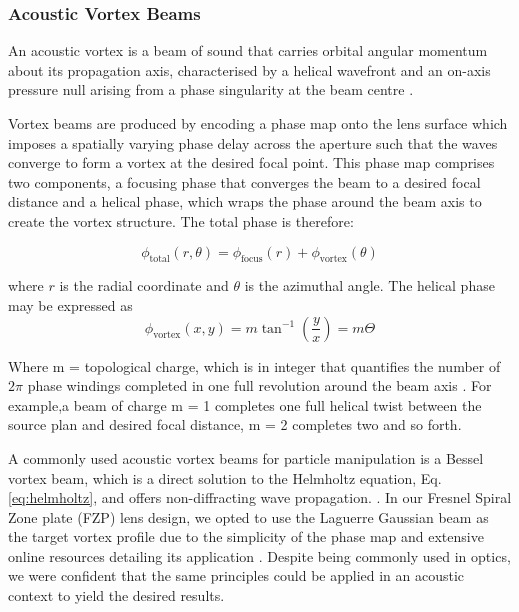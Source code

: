 \documentclass[11pt,a4paper]{article}
\begin{document}
\subsubsection{Acoustic Vortex Beams}
An acoustic vortex is a beam of sound that carries orbital angular momentum about its propagation axis, characterised by a helical wavefront and an on-axis pressure null arising from a phase singularity at the beam centre \cite{guo2022review}.

Vortex beams are produced by encoding a phase map onto the lens surface which imposes a spatially varying phase delay across the aperture such that the waves converge to form a vortex at the desired focal point. This phase map comprises two components, a focusing phase that converges the beam to a desired focal distance and a helical phase, which wraps the phase around the beam axis to create the vortex structure. The total phase is therefore:

\begin{equation}
    \phi_{\mathrm{total}}(r, \theta) = \phi_{\mathrm{focus}}(r) + 
    \phi_{\mathrm{vortex}}(\theta)
\end{equation} 

\noindent where $r$ is the radial coordinate and $\theta$ is the azimuthal angle. The helical phase may be expressed as
\begin{equation}
    \phi_{\mathrm{vortex}}(x,y)=m\tan^{-1}\!\left(\frac{y}{x}\right) = m \Theta
\end{equation}

\noindent Where m = topological charge, which is in integer that quantifies the number of $2\pi$ phase windings completed in one full revolution around the beam axis \cite{nye1974dislocations}. For example,a beam of charge m = 1 completes one full helical twist between the source plan and desired focal distance, m = 2 completes two and so forth. 

A commonly used acoustic vortex beams for particle manipulation is a Bessel vortex beam, which is a direct solution to the Helmholtz equation, Eq. \ref{eq:helmholtz}, and offers non-diffracting wave propagation.  \cite{khonina2020bessel}. In our Fresnel Spiral Zone plate (FZP) lens design, we opted to use the Laguerre Gaussian beam as the target vortex profile due to the simplicity of the phase map and extensive online resources detailing its application \cite{arlt2000laguerre}. Despite being commonly used in optics, we were confident that the same principles could be applied in an acoustic context to yield the desired results. 
\end{document}
